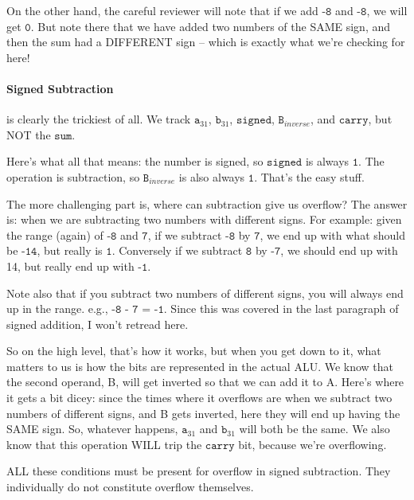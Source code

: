 \documentclass[a4paper]{article}
\begin{document}
On the other hand, the careful reviewer will note that if we add $\texttt{-8}$ and $\texttt{-8}$, we will get $\texttt{0}$. But note there that we have added two numbers of the SAME sign, and then the sum had a DIFFERENT sign -- which is exactly what we're checking for here!

\paragraph*{Signed Subtraction} is clearly the trickiest of all. We track $\texttt{a}_{31}$, $\texttt{b}_{31}$, $\texttt{signed}$, $\texttt{B}_{inverse}$, and $\texttt{carry}$, but NOT the $\texttt{sum}$.

Here's what all that means: the number is signed, so $\texttt{signed}$ is always $\texttt{1}$. The operation is subtraction, so $\texttt{B}_{inverse}$ is also always $\texttt{1}$. That's the easy stuff.

The more challenging part is, where can subtraction give us overflow? The answer is: when we are subtracting two numbers with different signs. For example: given the range (again) of $\texttt{-8}$ and $\texttt{7}$, if we subtract $\texttt{-8}$ by $\texttt{7}$, we end up with what should be $\texttt{-14}$, but really is $\texttt{1}$. Conversely if we subtract $\texttt{8}$ by $\texttt{-7}$, we should end up with 14, but really end up with $\texttt{-1}$.

Note also that if you subtract two numbers of different signs, you will always end up in the range. e.g., $\texttt{-8 - 7 = -1}$. Since this was covered in the last paragraph of signed addition, I won't retread here.

So on the high level, that's how it works, but when you get down to it, what matters to us is how the bits are represented in the actual ALU. We know that the second operand, B, will get inverted so that we can add it to A. Here's where it gets a bit dicey: since the times where it overflows are when we subtract two numbers of different signs, and B gets inverted, here they will end up having the SAME sign. So, whatever happens, $\texttt{a}_{31}$ and $\texttt{b}_{31}$ will both be the same. We also know that this operation WILL trip the $\texttt{carry}$ bit, because we're overflowing.

ALL these conditions must be present for overflow in signed subtraction. They individually do not constitute overflow themselves.
\end{document}

